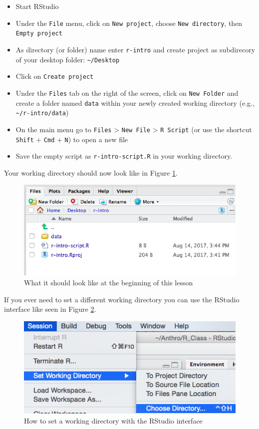 \documentclass[]{book}
\providecommand{\tightlist}{%
  \setlength{\itemsep}{0pt}\setlength{\parskip}{0pt}}
\theoremstyle{definition}
\theoremstyle{definition}
\theoremstyle{remark}
\begin{document}
\begin{itemize}
\tightlist
\item
  Start RStudio
\item
  Under the \texttt{File} menu, click on \texttt{New\ project}, choose
  \texttt{New\ directory}, then \texttt{Empty\ project}
\item
  As directory (or folder) name enter \texttt{r-intro} and create
  project as subdirecory of your desktop folder:
  \texttt{\textasciitilde{}/Desktop}
\item
  Click on \texttt{Create\ project}
\item
  Under the \texttt{Files} tab on the right of the screen, click on
  \texttt{New\ Folder} and create a folder named \texttt{data} within
  your newly created working directory (e.g.,
  \texttt{\textasciitilde{}/r-intro/data})
\item
  On the main menu go to \texttt{Files} \textgreater{}
  \texttt{New\ File} \textgreater{} \texttt{R\ Script} (or use the
  shortcut \texttt{Shift} + \texttt{Cmd} + \texttt{N}) to open a new
  file
\item
  Save the empty script as \texttt{r-intro-script.R} in your working
  directory.
\end{itemize}

Your working directory should now look like in Figure
\ref{fig:working-dir}.

\begin{figure}
\includegraphics[width=0.6\linewidth]{img/Rproject-setup} \caption{What it should look like at the beginning of this lesson}\label{fig:working-dir}
\end{figure}

If you ever need to set a different working directory you can use the
RStudio interface like seen in Figure \ref{fig:set-working-dir}.

\begin{figure}
\includegraphics[width=0.6\linewidth]{img/setWD} \caption{How to set a working directory with the RStudio interface}\label{fig:set-working-dir}
\end{figure}
\end{document}
